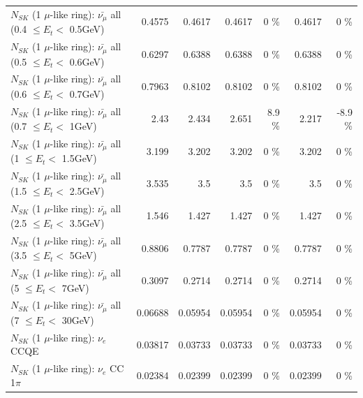 \begin{table}
\begin{tabular}{| l | r | r | r  r | r  r |}
 $N_{SK}$ (1 $\mu$-like ring): $\bar{\nu_{\mu}}$ all (0.4 $\leq E_{t} <$ 0.5GeV) &          0.4575 &          0.4617 &          0.4617 &        0 \%  &          0.4617 &        0 \%  \\ 
 $N_{SK}$ (1 $\mu$-like ring): $\bar{\nu_{\mu}}$ all (0.5 $\leq E_{t} <$ 0.6GeV) &          0.6297 &          0.6388 &          0.6388 &        0 \%  &          0.6388 &        0 \%  \\ 
 $N_{SK}$ (1 $\mu$-like ring): $\bar{\nu_{\mu}}$ all (0.6 $\leq E_{t} <$ 0.7GeV) &          0.7963 &          0.8102 &          0.8102 &        0 \%  &          0.8102 &        0 \%  \\ 
   $N_{SK}$ (1 $\mu$-like ring): $\bar{\nu_{\mu}}$ all (0.7 $\leq E_{t} <$ 1GeV) &            2.43 &           2.434 &           2.651 &      8.9 \%  &           2.217 &     -8.9 \%  \\ 
   $N_{SK}$ (1 $\mu$-like ring): $\bar{\nu_{\mu}}$ all (1 $\leq E_{t} <$ 1.5GeV) &           3.199 &           3.202 &           3.202 &        0 \%  &           3.202 &        0 \%  \\ 
 $N_{SK}$ (1 $\mu$-like ring): $\bar{\nu_{\mu}}$ all (1.5 $\leq E_{t} <$ 2.5GeV) &           3.535 &             3.5 &             3.5 &        0 \%  &             3.5 &        0 \%  \\ 
 $N_{SK}$ (1 $\mu$-like ring): $\bar{\nu_{\mu}}$ all (2.5 $\leq E_{t} <$ 3.5GeV) &           1.546 &           1.427 &           1.427 &        0 \%  &           1.427 &        0 \%  \\ 
   $N_{SK}$ (1 $\mu$-like ring): $\bar{\nu_{\mu}}$ all (3.5 $\leq E_{t} <$ 5GeV) &          0.8806 &          0.7787 &          0.7787 &        0 \%  &          0.7787 &        0 \%  \\ 
     $N_{SK}$ (1 $\mu$-like ring): $\bar{\nu_{\mu}}$ all (5 $\leq E_{t} <$ 7GeV) &          0.3097 &          0.2714 &          0.2714 &        0 \%  &          0.2714 &        0 \%  \\ 
    $N_{SK}$ (1 $\mu$-like ring): $\bar{\nu_{\mu}}$ all (7 $\leq E_{t} <$ 30GeV) &         0.06688 &         0.05954 &         0.05954 &        0 \%  &         0.05954 &        0 \%  \\ 
\hline
\hline
\hline
                                      $N_{SK}$ (1 $\mu$-like ring): $\nu_e$ CCQE &         0.03817 &         0.03733 &         0.03733 &        0 \%  &         0.03733 &        0 \%  \\ 
                                 $N_{SK}$ (1 $\mu$-like ring): $\nu_e$ CC 1$\pi$ &         0.02384 &         0.02399 &         0.02399 &        0 \%  &         0.02399 &        0 \%  \\ 

\end{tabular}
\end{table}

